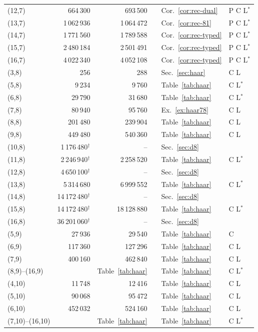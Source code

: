 \documentclass[11pt]{amsart}
\theoremstyle{definition}
\theoremstyle{remark}
\numberwithin{equation}{section}
\begin{document}
\begin{longtable}{@{}l r r r l l@{}}
(12,7) & 664\,300 & 693\,500 & & Cor.~\ref{cor:rec-dual} & P C L$^*$\\
(13,7) & 1\,062\,936 & 1\,064\,472 & & Cor.~\ref{cor:rec-81} & P C L$^*$\\
(14,7) & 1\,771\,560 & 1\,789\,588 & & Cor.~\ref{cor:rec-typed} & P C L$^*$\\
(15,7) & 2\,480\,184 & 2\,501\,491 & & Cor.~\ref{cor:rec-typed} & P C L$^*$\\
(16,7) & 4\,022\,340 & 4\,052\,108 & & Cor.~\ref{cor:rec-typed} & P C L$^*$\\
(3,8) & 256 & 288 & & Sec.~\ref{sec:haar} & C L\\
(5,8) & 9\,234 & 9\,760 & & Table~\ref{tab:haar} & C L$^*$\\
(6,8) & 29\,790 & 31\,680 & & Table~\ref{tab:haar} & C L$^*$\\
(7,8) & 80\,940 & 95\,760 & & Ex.~\ref{ex:haar78} & C L\\
(8,8) & 201\,480 & 239\,904 & & Table~\ref{tab:haar} & C L\\
(9,8) & 449\,480 & 540\,360 & & Table~\ref{tab:haar} & C L\\
(10,8) & 1\,176\,480$^\dagger$ & -- & & Sec.~\ref{sec:d8} & \\
(11,8) & 2\,246\,940$^\dagger$ & 2\,258\,520 & & Table~\ref{tab:haar} & C L$^*$\\
(12,8) & 4\,650\,100$^\dagger$ & -- & & Sec.~\ref{sec:d8} & \\
(13,8) & 5\,314\,680 & 6\,999\,552 & & Table~\ref{tab:haar} & C L$^*$\\
(14,8) & 14\,172\,480$^\dagger$ & -- & & Sec.~\ref{sec:d8} & \\
(15,8) & 14\,172\,480$^\dagger$ & 18\,128\,880 & & Table~\ref{tab:haar} & C L$^*$\\
(16,8) & 36\,201\,060$^\dagger$ & -- & & Sec.~\ref{sec:d8} & \\
(5,9) & 27\,936 & 29\,540 & & Table~\ref{tab:haar} & C\\
(6,9) & 117\,360 & 127\,296 & & Table~\ref{tab:haar} & C L\\
(7,9) & 400\,160 & 462\,840 & & Table~\ref{tab:haar} & C L\\
(8,9)--(16,9) & & Table~\ref{tab:haar} & & Table~\ref{tab:haar} & C L$^*$\\
(4,10) & 11\,748 & 12\,416 & & Table~\ref{tab:haar} & C L\\
(5,10) & 90\,068 & 95\,472 & & Table~\ref{tab:haar} & C L\\
(6,10) & 452\,032 & 524\,160 & & Table~\ref{tab:haar} & C L\\
(7,10)--(16,10) & & Table~\ref{tab:haar} & & Table~\ref{tab:haar} & C L$^*$\\
\end{longtable}
\end{document}
